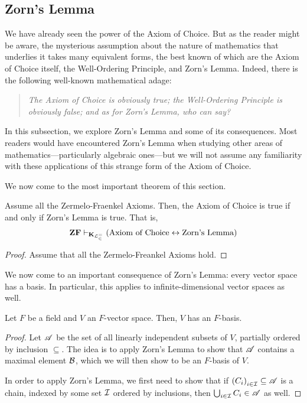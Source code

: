 \subsection{Zorn's Lemma}

We have already seen the power of the Axiom of Choice. But as the reader might be aware, the mysterious assumption about the nature of mathematics that underlies it takes many equivalent forms, the best known of which are the Axiom of Choice itself, the Well-Ordering Principle, and Zorn's Lemma. Indeed, there is the following well-known mathematical adage:
\begin{quote}
    \textit{The Axiom of Choice is obviously true; the Well-Ordering Principle is obviously false; and as for Zorn's Lemma, who can say?}
\end{quote}
In this subsection, we explore Zorn's Lemma and some of its consequences. Most readers would have encountered Zorn's Lemma when studying other areas of mathematics---particularly algebraic ones---but we will not assume any familiarity with these applications of this strange form of the Axiom of Choice.

\sorry %

\sorry %

We now come to the most important theorem of this section.
\begin{boxtheorem}
    Assume all the Zermelo-Fraenkel Axioms. Then, the Axiom of Choice is true if and only if Zorn's Lemma is true. That is,
    \begin{align*}
        \ZF \vklem \parenth{\text{Axiom of Choice} \lr \text{Zorn's Lemma}}
    \end{align*}
\end{boxtheorem}
\begin{proof}
    Assume that all the Zermelo-Freankel Axioms hold.
\end{proof}

\sorry %

We now come to an important consequence of Zorn's Lemma: every vector space has a basis. In particular, this applies to infinite-dimensional vector spaces as well.

\begin{boxtheorem}
    Let $F$ be a field and $V$ an $F$-vector space. Then, $V$ has an $F$-basis.
\end{boxtheorem}
\begin{proof}
    Let $\AA$ be the set of all linearly independent subsets of $V$, partially ordered by inclusion $\subseteq$. The idea is to apply Zorn's Lemma to show that $\AA$ contains a maximal element $\B$, which we will then show to be an $F$-basis of $V$.

    In order to apply Zorn's Lemma, we first need to show that if $\parenth{C_i}_{i \in \I} \subseteq \AA$ is a chain, indexed by some set $\I$ ordered by inclusions, then $\bigcup_{i \in \I} C_i \in \AA$ as well.
    
    \sorry
\end{proof}